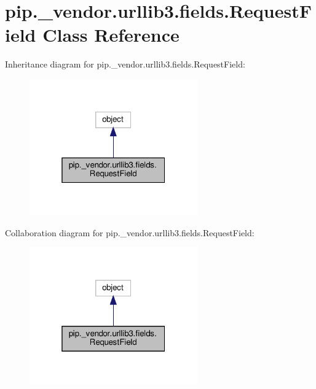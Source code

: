 \hypertarget{classpip_1_1__vendor_1_1urllib3_1_1fields_1_1RequestField}{}\section{pip.\+\_\+vendor.\+urllib3.\+fields.\+Request\+Field Class Reference}
\label{classpip_1_1__vendor_1_1urllib3_1_1fields_1_1RequestField}


Inheritance diagram for pip.\+\_\+vendor.\+urllib3.\+fields.\+Request\+Field\+:
\nopagebreak
\begin{figure}[H]
\begin{center}
\leavevmode
\includegraphics[width=205pt]{classpip_1_1__vendor_1_1urllib3_1_1fields_1_1RequestField__inherit__graph}
\end{center}
\end{figure}


Collaboration diagram for pip.\+\_\+vendor.\+urllib3.\+fields.\+Request\+Field\+:
\nopagebreak
\begin{figure}[H]
\begin{center}
\leavevmode
\includegraphics[width=205pt]{classpip_1_1__vendor_1_1urllib3_1_1fields_1_1RequestField__coll__graph}
\end{center}
\end{figure}
